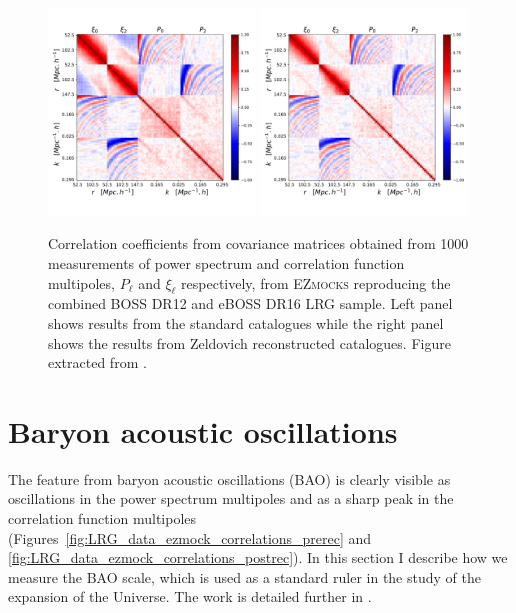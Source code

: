 \begin{figure}
    \centering 
    \includegraphics[width=0.49\textwidth]{fig/galaxies/covariance_prerecon.pdf}
    \includegraphics[width=0.49\textwidth]{fig/galaxies/covariance.pdf}
    \caption{Correlation coefficients from covariance matrices obtained from 1000 measurements
    of power spectrum and correlation function multipoles, $P_\ell$ and $\xi_\ell$ respectively,
    from \textsc{EZmocks} reproducing the combined BOSS DR12 and eBOSS DR16 LRG sample.
    Left panel shows results from the standard catalogues while the right panel 
    shows the results from Zeldovich reconstructed catalogues. 
    Figure extracted from \cite{dumerchatBaryonAcousticOscillations2022a}.
    }
    \label{fig:covariance_ezmock}
\end{figure}


\section{Baryon acoustic oscillations}
\label{galaxies:bao}

The feature from baryon acoustic oscillations (BAO) is clearly visible 
as oscillations in the power spectrum multipoles and as a sharp peak 
in the correlation function multipoles 
(Figures~\ref{fig:LRG_data_ezmock_correlations_prerec} and 
\ref{fig:LRG_data_ezmock_correlations_postrec}). 
In this section I describe how we measure the BAO scale, which 
is used as a standard ruler in the study of the expansion of the Universe. 
The work is detailed further in 
\cite{bautistaSDSSIVExtendedBaryon2018,
bautistaCompletedSDSSIVExtended2021,
gil-marinCompletedSDSSIVExtended2020}.

